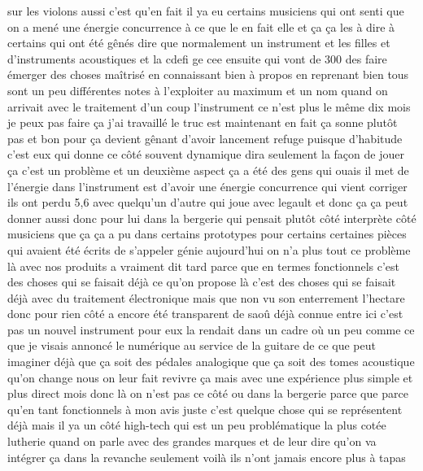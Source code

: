 sur les violons aussi c'est qu'en fait il ya eu certains musiciens qui ont senti que on a mené une énergie concurrence à ce que le en fait elle et ça ça les à dire à certains qui ont été gênés dire que normalement un instrument et les filles et d'instruments acoustiques et la cdefi ge cee ensuite qui vont de 300 des faire émerger des choses maîtrisé en connaissant bien à propos en reprenant bien tous sont un peu différentes notes à l'exploiter au maximum et un nom quand on arrivait avec le traitement d'un coup l'instrument ce n'est plus le même dix mois je peux pas faire ça j'ai travaillé le truc est maintenant en fait ça sonne plutôt pas et bon pour ça devient gênant d'avoir lancement refuge puisque d'habitude c'est eux qui donne ce côté souvent dynamique dira seulement la façon de jouer ça c'est un problème et un deuxième aspect ça a été des gens qui ouais il met de l'énergie dans l'instrument est d'avoir une énergie concurrence qui vient corriger ils ont perdu 5,6 avec quelqu'un d'autre qui joue avec legault et donc ça ça peut donner aussi donc pour lui dans la bergerie qui pensait plutôt côté interprète côté musiciens que ça ça a pu dans certains prototypes pour certains certaines pièces qui avaient été écrits de s'appeler génie aujourd'hui on n'a plus tout ce problème là avec nos produits a vraiment dit tard parce que en termes fonctionnels c'est des choses qui se faisait déjà ce qu'on propose là c'est des choses qui se faisait déjà avec du traitement électronique mais que non vu son enterrement l'hectare donc pour rien côté a encore été transparent de saoû déjà connue entre ici c'est pas un nouvel instrument pour eux la rendait dans un cadre où un peu comme ce que je visais annoncé le numérique au service de la guitare de ce que peut imaginer déjà que ça soit des pédales analogique que ça soit des tomes acoustique qu'on change nous on leur fait revivre ça mais avec une expérience plus simple et plus direct mois donc là on n'est pas ce côté ou dans la bergerie parce que parce qu'en tant fonctionnels à mon avis juste c'est quelque chose qui se représentent déjà mais il ya un côté high-tech qui est un peu problématique la plus cotée lutherie quand on parle avec des grandes marques et de leur dire qu'on va intégrer ça dans la revanche seulement voilà ils n'ont jamais encore plus à tapas
